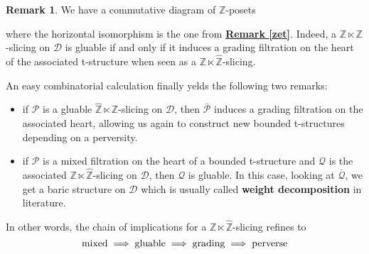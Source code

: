 \documentclass{article}
\theoremstyle{definition}
\newtheorem{rem}[thm]{Remark}
\begin{document}
\begin{rem}
We have a commutative diagram of $\mathbb{Z}$-posets 
\begin{center}
\end{center}
where the horizontal isomorphism is the one from \hyperref[zet]{\textbf{Remark \ref*{zet}}}. Indeed, a $\mathbb{Z} \ltimes \mathbb{Z}$-slicing on $\mathscr{D}$ is gluable if and only if it induces a grading filtration on the heart of the associated t-structure when seen as a $\mathbb{Z} \ltimes \hat{\mathbb{Z}}$-slicing. 
\end{rem} 

An easy combinatorial calculation finally yelds the following two remarks: 
\begin{itemize}
\item  if $\mathscr{P}$ is a gluable $\hat{\mathbb{Z}} \ltimes \mathbb{Z}$-slicing on $\mathscr{D}$, then $\overline{\mathscr{P}}$ induces a grading filtration on the associated heart, allowing us again to construct new bounded t-structures depending on a perversity. 
\item if $\mathscr{P}$ is a mixed filtration on the heart of a bounded t-structure and $\mathscr{Q}$ is the associated $\mathbb{Z} \ltimes \hat{\mathbb{Z}}$-slicing on $\mathscr{D}$, then $\mathscr{Q}$ is gluable. In this case, looking at $\overline{\mathscr{Q}}$, we get a baric structure on $\mathscr{D}$ which is usually called \textbf{weight decomposition} in literature. 
\end{itemize}
In other words, the chain of implications for a $\mathbb{Z} \ltimes \hat{\mathbb{Z}}$-slicing refines to 
$$\textnormal{mixed} \implies \textnormal{gluable} \implies \textnormal{grading} \implies \textnormal{perverse} $$
\end{document}
